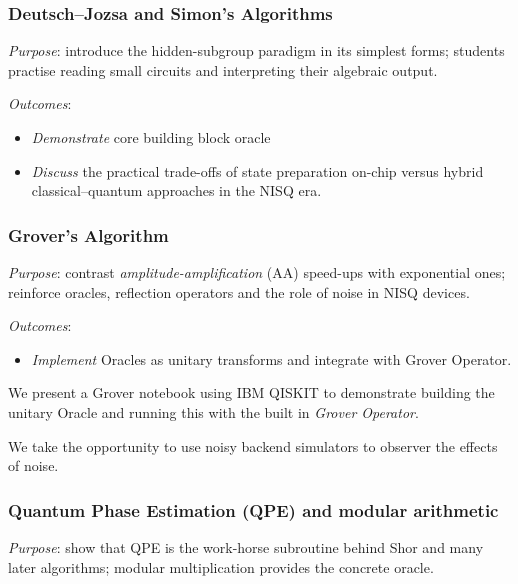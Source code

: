 \subsubsection*{Deutsch–Jozsa and Simon's Algorithms}

\emph{Purpose}: introduce the hidden-subgroup paradigm in its simplest forms; 
students practise reading small circuits and interpreting their algebraic output.


\emph{Outcomes}:
\begin{itemize}
	\item \emph{Demonstrate} core building block oracle
	\item \emph{Discuss} the practical trade-offs of state preparation on-chip versus hybrid classical–quantum approaches in the NISQ era.
\end{itemize}

\subsubsection*{Grover's Algorithm}

\emph{Purpose}: contrast \emph{amplitude-amplification} (AA) speed-ups with exponential ones; 
reinforce oracles, reflection operators and the role of noise in NISQ devices.

\emph{Outcomes}:
\begin{itemize}
	\item \emph{Implement} Oracles as unitary transforms and integrate with Grover Operator.
\end{itemize}

We present a Grover notebook using IBM QISKIT to demonstrate building the unitary Oracle
and running this with the built in \emph{Grover Operator}.

We take the opportunity to use noisy backend simulators to observer the effects of noise.

\subsubsection*{Quantum Phase Estimation (QPE) and modular arithmetic}

\emph{Purpose}: show that QPE is the work-horse subroutine behind Shor and many later algorithms; 
modular multiplication provides the concrete oracle.

